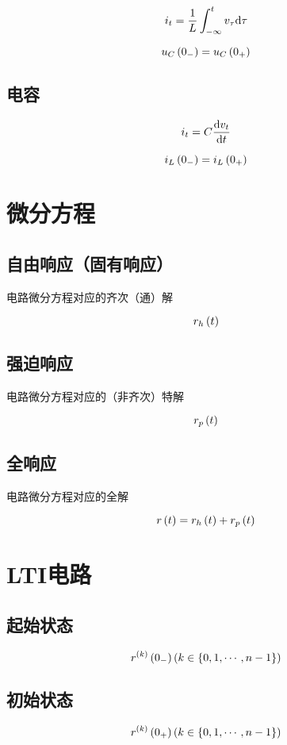 \documentclass{article}
\begin{document}
\[i_t=\frac1L\int_{-\infty}^tv_\tau\mathrm d\tau\]

\[u_C\left(0_-\right)=u_C\left(0_+\right)\]

\subsection{电容}

\[i_t=C\frac{\mathrm d v_t}{\mathrm d t}\]

\[i_L\left(0_-\right)=i_L\left(0_+\right)\]

\section{微分方程}

\subsection{自由响应（固有响应）}

电路微分方程对应的齐次（通）解

\[r_h\left(t\right)\]

\subsection{强迫响应}

电路微分方程对应的（非齐次）特解

\[r_p\left(t\right)\]

\subsection{全响应}

电路微分方程对应的全解

\[r\left(t\right)=r_h\left(t\right)+r_p\left(t\right)\]

\section{LTI电路}

\subsection{起始状态}

\[r^{\left(k\right)}\left(0_-\right)
    \left(k\in\{0,1,\cdots,n-1\}\right)\]

\subsection{初始状态}

\[r^{\left(k\right)}\left(0_+\right)
    \left(k\in\{0,1,\cdots,n-1\}\right)\]
\end{document}
